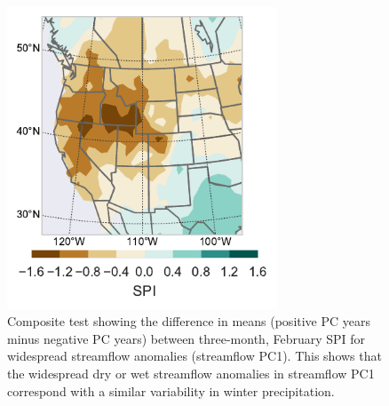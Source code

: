 \documentclass[final, double]{ua-thesis}
\begin{document}
\begin{figure}[ht]
 \centerline{\includegraphics[width=19pc]{p2figures/fig_spi_composite.pdf}}
  \caption{Composite test showing the difference in means (positive PC years minus negative PC years) between three-month, February SPI for widespread streamflow anomalies (streamflow PC1). This shows that the widespread dry or wet streamflow anomalies in streamflow PC1 correspond with a similar variability in winter precipitation.}\label{fig_spi_composite}
\end{figure}
\end{document}
